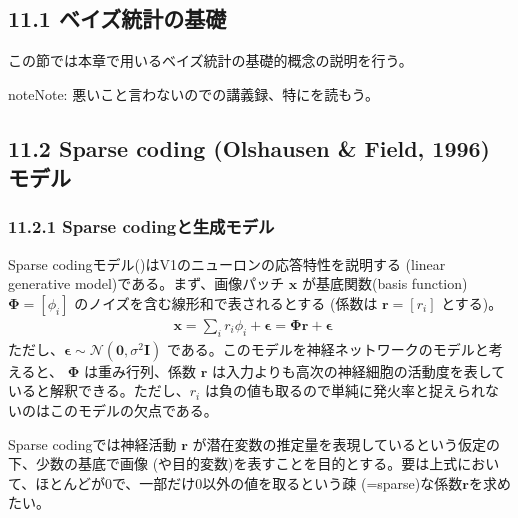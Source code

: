 \documentclass[letterpaper,10pt,english]{sphinxmanual}
\begin{document}
\subsection{11.1 ベイズ統計の基礎}
\label{\detokenize{11-1_bayes_statistics:id1}}\label{\detokenize{11-1_bayes_statistics::doc}}
この節では本章で用いるベイズ統計の基礎的概念の説明を行う。

\begin{sphinxadmonition}{note}{Note:}
悪いこと言わないのでの講義録、特にを読もう。
\end{sphinxadmonition}


\subsection{11.2 Sparse coding (Olshausen \& Field, 1996) モデル}
\label{\detokenize{11-2_sparse-coding:sparse-coding-olshausen-field-1996}}\label{\detokenize{11-2_sparse-coding::doc}}

\subsubsection{11.2.1 Sparse codingと生成モデル}
\label{\detokenize{11-2_sparse-coding:sparse-coding}}
Sparse codingモデル()はV1のニューロンの応答特性を説明する (linear generative model)である。まず、画像パッチ \(\mathbf{x}\) が基底関数(basis function) \(\mathbf{\Phi} = [\phi_i]\) のノイズを含む線形和で表されるとする (係数は \(\mathbf{r}=[r_i]\) とする)。
\begin{equation*}
\begin{split}
\mathbf{x} = \sum_i r_i \phi_i + \mathbf{\epsilon} = \mathbf{\Phi} \mathbf{r}+ \mathbf{\epsilon} \quad \tag{1}
\end{split}
\end{equation*}
ただし、\(\mathbf{\epsilon} \sim \mathcal{N}(\mathbf{0}, \sigma^2 \mathbf{I})\) である。このモデルを神経ネットワークのモデルと考えると、 \(\mathbf{\Phi}\) は重み行列、係数 \(\mathbf{r}\) は入力よりも高次の神経細胞の活動度を表していると解釈できる。ただし、\(r_i\) は負の値も取るので単純に発火率と捉えられないのはこのモデルの欠点である。

Sparse codingでは神経活動 \(\mathbf{r}\) が潜在変数の推定量を表現しているという仮定の下、少数の基底で画像 (や目的変数)を表すことを目的とする。要は上式において、ほとんどが0で、一部だけ0以外の値を取るという疎 (=sparse)な係数\(\mathbf{r}\)を求めたい。
\end{document}
